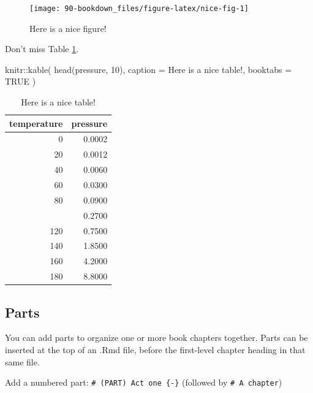\documentclass[
]{bxjsbook}
\newenvironment{Shaded}{\begin{snugshade}}{\end{snugshade}}
\newcommand{\AttributeTok}[1]{\textcolor[rgb]{0.77,0.63,0.00}{#1}}
\newcommand{\ConstantTok}[1]{\textcolor[rgb]{0.00,0.00,0.00}{#1}}
\newcommand{\DecValTok}[1]{\textcolor[rgb]{0.00,0.00,0.81}{#1}}
\newcommand{\FunctionTok}[1]{\textcolor[rgb]{0.00,0.00,0.00}{#1}}
\newcommand{\NormalTok}[1]{#1}
\newcommand{\SpecialCharTok}[1]{\textcolor[rgb]{0.00,0.00,0.00}{#1}}
\newcommand{\StringTok}[1]{\textcolor[rgb]{0.31,0.60,0.02}{#1}}
\theoremstyle{definition}
\theoremstyle{definition}
\theoremstyle{definition}
\theoremstyle{definition}
\theoremstyle{remark}
\begin{document}
\begin{figure}

{\centering \texttt{[image: 90-bookdown\_files/figure-latex/nice-fig-1]} 

}

\caption{Here is a nice figure!}\label{fig:nice-fig}
\end{figure}

Don't miss Table \ref{tab:nice-tab}.

\begin{Shaded}
\begin{Highlighting}[]
\NormalTok{knitr}\SpecialCharTok{::}\FunctionTok{kable}\NormalTok{(}
  \FunctionTok{head}\NormalTok{(pressure, }\DecValTok{10}\NormalTok{), }\AttributeTok{caption =} \StringTok{\textquotesingle{}Here is a nice table!\textquotesingle{}}\NormalTok{,}
  \AttributeTok{booktabs =} \ConstantTok{TRUE}
\NormalTok{)}
\end{Highlighting}
\end{Shaded}

\begin{table}

\caption{\label{tab:nice-tab}Here is a nice table!}
\centering
\begin{tabular}[t]{rr}
\toprule
temperature & pressure\\
\midrule
0 & 0.0002\\
20 & 0.0012\\
40 & 0.0060\\
60 & 0.0300\\
80 & 0.0900\\
\addlinespace
100 & 0.2700\\
120 & 0.7500\\
140 & 1.8500\\
160 & 4.2000\\
180 & 8.8000\\
\bottomrule
\end{tabular}
\end{table}

\hypertarget{parts}{%
\subsection{Parts}\label{parts}}

You can add parts to organize one or more book chapters together. Parts can be inserted at the top of an .Rmd file, before the first-level chapter heading in that same file.

Add a numbered part: \texttt{\#\ (PART)\ Act\ one\ \{-\}} (followed by \texttt{\#\ A\ chapter})
\end{document}
